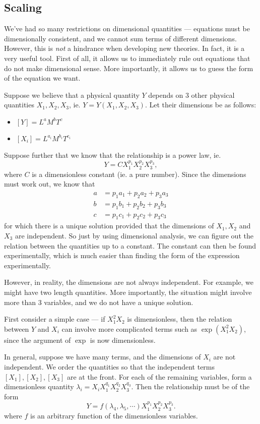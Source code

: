 \documentclass[a4paper]{article}
\begin{document}
\subsection{Scaling}
We've had so many restrictions on dimensional quantities --- equations must be dimensionally consistent, and we cannot sum terms of different dimensions. However, this is \emph{not} a hindrance when developing new theories. In fact, it is a very useful tool. First of all, it allows us to immediately rule out equations that do not make dimensional sense. More importantly, it allows us to guess the form of the equation we want.

Suppose we believe that a physical quantity $Y$ depends on $3$ other physical quantities $X_1, X_2, X_3$, ie. $Y = Y(X_1, X_2, X_3)$. Let their dimensions be as follows:
\begin{itemize}
  \item $[Y] = L^aM^bT^c$
  \item $[X_i] = L^{a_i}M^{b_i}T^{c_i}$
\end{itemize}
Suppose further that we know that the relationship is a power law, ie.
\[
  Y = CX_1^{p_1}X_2^{p_2}X_3^{p_3},
\]
where $C$ is a dimensionless constant (ie. a pure number). Since the dimensions must work out, we know that
\begin{align*}
  a &= p_1a_1 + p_2a_2 + p_3a_3\\
  b &= p_1b_1 + p_2b_2 + p_3b_3\\
  c &= p_1c_1 + p_2c_2 + p_3c_3
\end{align*}
for which there is a unique solution provided that the dimensions of $X_1, X_2$ and $X_3$ are independent. So just by using dimensional analysis, we can figure out the relation between the quantities up to a constant. The constant can then be found experimentally, which is much easier than finding the form of the expression experimentally.

However, in reality, the dimensions are not always independent. For example, we might have two length quantities. More importantly, the situation might involve more than 3 variables, and we do not have a unique solution.

First consider a simple case --- if $X_1^2 X_2$ is dimensionless, then the relation between $Y$ and $X_i$ can involve more complicated terms such as $\exp (X_1^2 X_2)$, since the argument of $\exp$ is now dimensionless.

In general, suppose we have many terms, and the dimensions of $X_i$ are not independent. We order the quantities so that the independent terms $[X_1], [X_2], [X_3]$ are at the front. For each of the remaining variables, form a dimensionless quantity $\lambda_i = X_iX_1^{q_1}X_2^{q_2}X_3^{q_3}$. Then the relationship must be of the form
\[
  Y = f(\lambda_4, \lambda_5, \cdots) X_1^{p_1}X_2^{p_2}X_3^{p_3}.
\]
where $f$ is an arbitrary function of the dimensionless variables.
\end{document}
